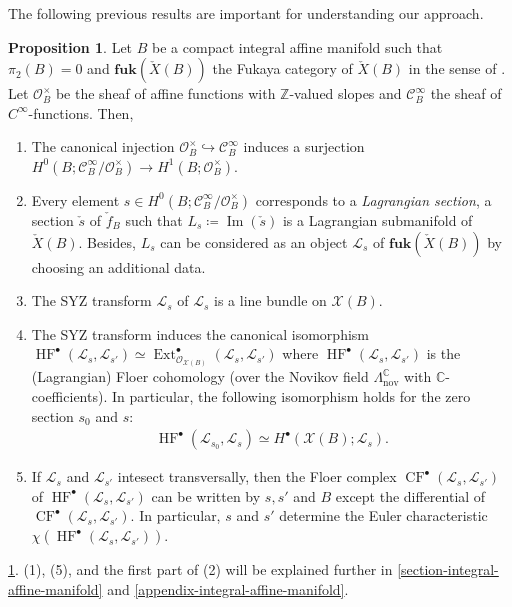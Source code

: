 \documentclass[a4paper,dvipdfmx,reqno,12pt]{amsart}
\theoremstyle{definition}
\newtheorem{proposition}[theorem]{Proposition}
\newcommand{\deq}{\coloneqq}
\newcommand{\opn}[1]{\operatorname{#1}}
\newcommand{\catn}[1]{\mathbf{#1}}
\newcommand{\hookto}{\hookrightarrow}
\numberwithin{equation}{section}
\begin{document}
The following previous results are important for 
understanding our approach.

\begin{proposition}
\label{proposition-semi-flat-syz}
Let $B$ be a compact integral affine manifold
such that $\pi_2(B)=0$
and $\catn{fuk}(\check{X}(B))$ 
the Fukaya category of $\check{X}(B)$ in the 
sense of \cite{MR4301560}.
Let $\mathcal{O}_{B}^{\times}$ be the sheaf of 
affine functions with $\mathbb{Z}$-valued slopes and 
$\mathcal{C}^{\infty}_{B}$ the sheaf of 
$C^{\infty}$-functions. Then,
\begin{enumerate}
\setlength{\leftskip}{-12pt}
\item The canonical injection 
$\mathcal{O}^{\times}_{B}\hookto \mathcal{C}^{\infty}_{B}$
induces a surjection 
$H^{0}(B;\mathcal{C}^{\infty}_{B}/
\mathcal{O}^{\times}_{B})
\to H^{1}(B;\mathcal{O}^{\times}_{B})$.
\item Every element 
$s\in H^{0}(B;\mathcal{C}^{\infty}_{B}/
\mathcal{O}^{\times}_{B})$ corresponds to 
a \emph{Lagrangian section}, a section 
$\check{s}$ of 
$\check{f}_{B}$ such that $L_s\deq\opn{Im}(\check{s})$ is 
a Lagrangian submanifold of 
$\check{X}(B)$. Besides, 
$L_s$ can be considered as an object
$\mathscr{L}_{s}$ of 
$\catn{fuk}(\check{X}(B))$ by choosing an
additional data.
\item The SYZ transform 
$\mathcal{L}_s$ of $\mathscr{L}_s$ is a line bundle
on $\mathcal{X}(B)$.
\item The SYZ transform induces 
the canonical isomorphism 
$\opn{HF}^{\bullet}(\mathscr{L}_s,\mathscr{L}_{s'})
\simeq \opn{Ext}^{\bullet}_{\mathcal{O}_{\mathcal{X}(B)}}(\mathcal{L}_s,\mathcal{L}_{s'})$
where $\opn{HF}^{\bullet}(\mathscr{L}_s,\mathscr{L}_{s'})$
is the (Lagrangian) Floer cohomology (over the 
Novikov field $\Lambda_{\mathrm{nov}}^{\mathbb{C}}$
with $\mathbb{C}$-coefficients).
In particular, the following isomorphism holds 
for the zero section $s_0$ and $s$:
\begin{align}
\opn{HF}^{\bullet}(\mathscr{L}_{s_0},\mathscr{L}_s)
\simeq H^{\bullet}(\mathcal{X}(B);\mathcal{L}_s).
\end{align}
\item If $\mathscr{L}_s$ and 
$\mathscr{L}_{s'}$ intesect transversally, then 
the Floer complex 
$\opn{CF}^{\bullet}(\mathscr{L}_s,\mathscr{L}_{s'})$
of $\opn{HF}^{\bullet}(\mathscr{L}_s,\mathscr{L}_{s'})$ 
can be written by $s,s'$ and $B$
except the differential of 
$\opn{CF}^{\bullet}(\mathscr{L}_s,\mathscr{L}_{s'})$.
In particular, $s$ and $s'$ 
determine the Euler characteristic 
$\chi(\opn{HF}^{\bullet}(\mathscr{L}_s,\mathscr{L}_{s'}))$.
\end{enumerate}

\end{proposition}
\cref{proposition-semi-flat-syz}. (1), (5), and
the first part of (2) will be explained further 
in \cref{section-integral-affine-manifold} 
and \cref{appendix-integral-affine-manifold}.
\end{document}
